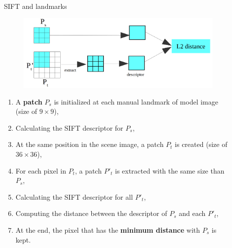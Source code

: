 \documentclass{LaBRI_poster}
\begin{document}
\begin{frame}[t]
\begin{columns}[t]
\begin{column}{\twocolwidth}
\begin{block}{SIFT and landmarks}
\begin{figure}
    	 \centering
    	 \includegraphics[scale=.7]{images/extract}
    \end{figure}
    \begin{enumerate}[\hspace{25pt}1.]
    		\item A \textbf{patch} $P_s$ is initialized at each manual landmark of model image (size of $9\times9$),
    		\item Calculating the SIFT\cite{lowe1999object} descriptor for $P_s$,
    		\item At the same position in the scene image, a patch $P_t$ is created (size of $36\times36$),
    		\item For each pixel in $P_t$, a patch $P'_t$ is extracted with the same size than $P_s$,
    		\item Calculating the SIFT descriptor for all $P'_t$,
    		\item Computing the distance between the descriptor of $P_s$ and each $P'_t$,
    		\item At the end, the pixel that has the \textbf{minimum distance} with $P_s$ is kept.
    \end{enumerate}
\end{block}

\end{column}

\begin{column}{\sepwidth}\end{column}

\begin{column}{\twocolwidth}


\end{column}
\end{columns}
\end{frame}
\end{document}
